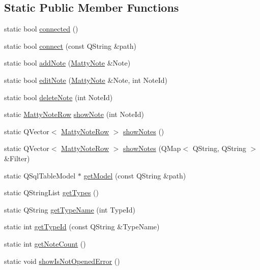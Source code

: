 \subsection*{Static Public Member Functions}
\begin{DoxyCompactItemize}
\item 
static bool \hyperlink{class_db_manager_a42939729261d4c90644fd6a5fd0d70d3}{connected} ()
\item 
static bool \hyperlink{class_db_manager_abc90b3bf97dda268b4160a0662305898}{connect} (const Q\+String \&path)
\item 
static bool \hyperlink{class_db_manager_a4f063b57678616ccef3515088a04ac51}{add\+Note} (\hyperlink{class_matty_note}{Matty\+Note} \&Note)
\item 
static bool \hyperlink{class_db_manager_af27c0367d70db496305ec5cab6324fe9}{edit\+Note} (\hyperlink{class_matty_note}{Matty\+Note} \&Note, int Note\+Id)
\item 
static bool \hyperlink{class_db_manager_a164849758fd05445c7af2cc04fc3569f}{delete\+Note} (int Note\+Id)
\item 
static \hyperlink{struct_matty_note_row}{Matty\+Note\+Row} \hyperlink{class_db_manager_a762b5de4ac78f4ae4393d11e51a58c67}{show\+Note} (int Note\+Id)
\item 
static Q\+Vector$<$ \hyperlink{struct_matty_note_row}{Matty\+Note\+Row} $>$ \hyperlink{class_db_manager_a6ac14828f37470d4feed38c9641b9922}{show\+Notes} ()
\item 
static Q\+Vector$<$ \hyperlink{struct_matty_note_row}{Matty\+Note\+Row} $>$ \hyperlink{class_db_manager_a64082f688c2d477c92a6f3a67fdebbf8}{show\+Notes} (Q\+Map$<$ Q\+String, Q\+String $>$ \&Filter)
\item 
static Q\+Sql\+Table\+Model $\ast$ \hyperlink{class_db_manager_ac4e759380194e624382e267432de5357}{get\+Model} (const Q\+String \&path)
\item 
static Q\+String\+List \hyperlink{class_db_manager_ade7585873652935bb12cb1ad546ceba2}{get\+Types} ()
\item 
static Q\+String \hyperlink{class_db_manager_a6cb58e12049873e8b1b4b6ecd74dbfb6}{get\+Type\+Name} (int Type\+Id)
\item 
static int \hyperlink{class_db_manager_a92ebefd0d5fae643db1fc51cc7ea0c31}{get\+Type\+Id} (const Q\+String \&Type\+Name)
\item 
static int \hyperlink{class_db_manager_ae3998b50545d88a27d4361053f39b050}{get\+Note\+Count} ()
\item 
static void \hyperlink{class_db_manager_adacc32b7691062fef95171aeab5e8903}{show\+Is\+Not\+Opened\+Error} ()
\end{DoxyCompactItemize}
